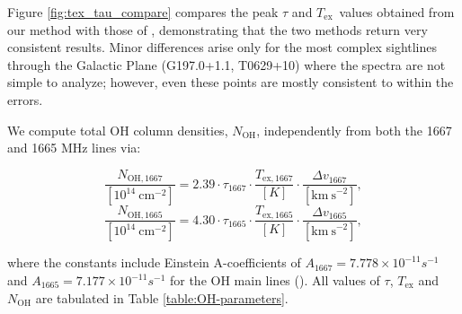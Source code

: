 \documentclass[preprint]{emulateapj}
\def\Tex{$T_{\mathrm{ex}}$}
\begin{document}
Figure \ref{fig:tex_tau_compare} compares the peak $\tau$ and \Tex\ values obtained from our method with those of \citet{Li2017}, demonstrating that the two methods return very consistent results. %
Minor differences arise only for the most complex sightlines through the Galactic Plane (G197.0+1.1, T0629+10) where the spectra are not simple to analyze; however, even these points are mostly consistent to within the errors. 

\par
We compute total OH column densities, $N_\mathrm{OH}$, independently from both the 1667 and 1665 MHz lines via: %

\begin{equation}
\frac{N_{\mathrm{OH,1667}}}{[10^{14}~\mathrm{cm}^{-2}]}=2.39 \cdot \tau_{1667} \cdot \frac{T_\mathrm{ex,1667}}{[K]} \cdot \frac{\Delta v_{1667}}{[\mathrm{km~s}^{-2}]},
\label{eq_noh67rd}
\end{equation}
\begin{equation}
\frac{N_{\mathrm{OH,1665}}}{[10^{14}~\mathrm{cm}^{-2}]}=4.30 \cdot \tau_{1665} \cdot \frac{T_{\mathrm{ex},1665}}{[K]} \cdot \frac{\Delta v_{1665}}{[\mathrm{km~s}^{-2}]},
\label{eq_noh65rd}
\end{equation}

\noindent where the constants include Einstein A-coefficients of $A_{1667}=7.778\times 10^{-11} s^{-1}$ and $A_{1665}=7.177\times 10^{-11} s^{-1}$ for the OH main lines (\citealt{Destombes1977}). All values of $\tau$, $T_\mathrm{ex}$ and $N_\mathrm{OH}$ are tabulated in Table \ref{table:OH-parameters}. %
\end{document}
